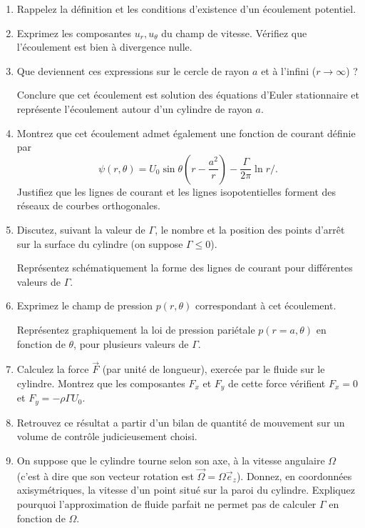 \begin{enumerate}
\item Rappelez la définition et les conditions d'existence d'un écoulement potentiel.

\item Exprimez les composantes $u_r, u_\theta$ du champ de vitesse. Vérifiez que l'écoulement est bien à divergence nulle.

\item 
Que deviennent ces expressions sur le cercle de rayon $a$ et à l'infini 
($r \rightarrow \infty$) ? 

Conclure que cet écoulement est solution des équations d'Euler stationnaire
et représente l'écoulement autour d'un cylindre de rayon $a$.

\item Montrez que cet écoulement admet également une fonction de courant définie par
$$
\psi(r,\theta) = U_0   \sin \theta \left( r - \frac{a^2}{r}\right)  
   - \frac{\Gamma}{2 \pi} \ln r/.
 $$
Justifiez que les lignes de courant et les lignes isopotentielles forment des réseaux de courbes orthogonales.


\item Discutez, suivant la valeur de $\Gamma$, le nombre et la position
des points d'arrêt sur la surface du cylindre (on suppose $\Gamma \leq 0$).

Représentez schématiquement la forme des lignes de courant pour 
différentes valeurs de $\Gamma$.


\item Exprimez le champ de pression $p(r,\theta)$ correspondant à cet écoulement.

Représentez graphiquement la loi de pression pariétale $p(r=a,\theta)$ en fonction de $\theta$,
pour plusieurs valeurs de $\Gamma$.


\item Calculez la force $\vec F$ (par unité de longueur),
exercée par le fluide sur le cylindre. 
Montrez que les composantes $F_x$ et $F_y$ de cette force
 v\'erifient $F_x = 0$ et $F_y = - \rho \Gamma
  U_0$. 
 
 \item Retrouvez ce résultat a partir d'un bilan de quantité de mouvement sur un volume de contrôle judicieusement choisi.
 
   
\item On suppose que le cylindre tourne selon son axe, à la vitesse angulaire
$\Omega$ (c'est à dire que son vecteur rotation est 
$\vec \Omega = \Omega \vec e_z$). 
Donnez, en coordonnées axisymétriques, la  vitesse d'un point situé 
sur la paroi du cylindre. Expliquez pourquoi l'approximation de fluide
parfait ne permet pas de calculer $\Gamma$ en fonction de $\Omega$.



\end{enumerate}
